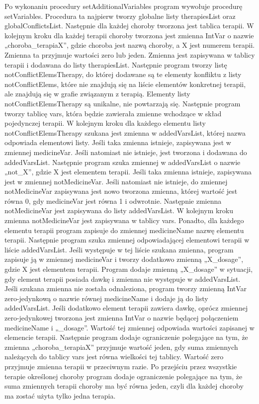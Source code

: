 \documentclass[oneside,a4paper]{book}
\begin{document}
\begin{spacing}{1.5}
Po wykonaniu procedury setAdditionalVariables program wywołuje procedurę setVariables. Procedura ta najpierw tworzy globalne listy therapiesList oraz globalConflictsList. Następnie dla każdej choroby tworzona jest tablica terapii. W kolejnym kroku dla każdej terapii choroby tworzona jest zmienna IntVar o nazwie „choroba\_terapiaX”, gdzie choroba jest nazwą choroby, a X jest numerem terapii. Zmienna ta przyjmuje wartości zero lub jeden. Zmienna jest zapisywana w tablicy terapii i dodawana do listy therapiesList. Następnie program tworzy listę notConflictElemsTherapy, do której dodawane są te elementy konfliktu z listy notConflictElems, które nie znajdują się na liście elementów konkretnej terapii, ale znajdują się w grafie związanym z terapią. Elementy listy notConflictElemsTherapy są unikalne, nie powtarzają się. Następnie program tworzy tablicę vars, która będzie zawierała zmienne wchodzące w skład pojedynczej terapii. W kolejnym kroku dla każdego elementu listy notConflictElemsTherapy szukana jest zmienna w addedVarsList, której nazwa odpowiada elementowi listy. Jeśli taka zmienna istnieje, zapisywana jest w zmiennej medicineVar. Jeśli natomiast nie istnieje, jest tworzona i dodawana do addedVarsList. Następnie program szuka zmiennej w addedVarsList o nazwie „not\_X”, gdzie X jest elementem terapii. Jeśli taka zmienna istnieje, zapisywana jest w zmiennej notMedicineVar. Jeśli natomiast nie istnieje, do zmiennej notMedicineVar zapisywana jest nowo tworzona zmienna, której wartość jest równa 0, gdy medicineVar jest równa 1 i odwrotnie. Następnie zmienna notMedicineVar jest zapisywana do listy addedVarsList. W kolejnym kroku zmienna notMedicineVar jest zapisywana w tablicy vars. Ponadto, dla każdego elementu terapii program zapisuje do zmiennej medicineName nazwę elementu terapii. Następnie program szuka zmiennej odpowiadającej elementowi terapii w liście addedVarsList. Jeśli występuje w tej liście szukana zmienna, program zapisuje ją w zmiennej medicineVar i tworzy dodatkowo zmienną „X\_dosage”, gdzie X jest elementem terapii. Program dodaje zmienną „X\_dosage” w sytuacji, gdy element terapii posiada dawkę i zmienna nie występuje w addedVarsList. Jeśli szukana zmienna nie została odnaleziona, program tworzy zmienną IntVar zero-jedynkową o nazwie równej medicineName i dodaje ją do listy addedVarsList. Jeśli dodatkowo element terapii zawiera dawkę, oprócz zmiennej zero-jedynkowej tworzona jest zmienna IntVar o nazwie będącej połączeniem medicineName i „\_dosage”. Wartość tej zmiennej odpowiada wartości zapisanej w elemencie terapii. Następnie program dodaje ograniczenie polegające na tym, że zmienna „choroba\_terapiaX” przyjmuje wartość jeden, gdy suma zmiennych należących do tablicy vars jest równa wielkości tej tablicy. Wartość zero przyjmuje zmienna terapii w przeciwnym razie. Po przejściu przez wszystkie terapie określonej choroby program dodaje ograniczenie polegające na tym, że suma zmiennych terapii choroby ma być równa jeden, czyli dla każdej choroby ma zostać użyta tylko jedna terapia. 


\end{spacing}
\end{document}
